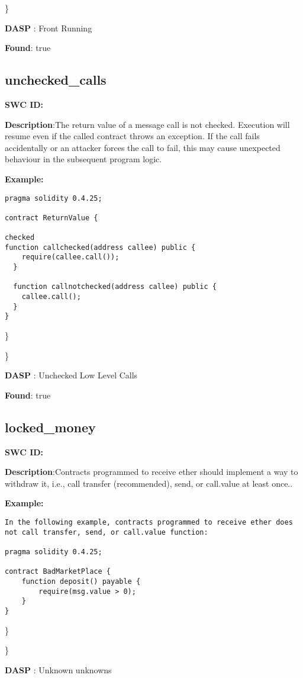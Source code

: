 \documentclass{article}
\begin{document}
\} 

\textbf{DASP} : Front Running

\textbf{Found}: true

\subsection{unchecked\_calls} 
\textbf{SWC \textunderscore ID:} 

\textbf{Description}:The return value of a message call is not checked. Execution will resume even if the called contract throws an exception. If the call fails accidentally or an attacker forces the call to fail, this may cause unexpected behaviour in the subsequent program logic.


\textbf{Example:} 
\begin{verbatim}
pragma solidity 0.4.25;

contract ReturnValue {

checked
function callchecked(address callee) public {
    require(callee.call());
  }

  function callnotchecked(address callee) public {
    callee.call();
  }
}

\end{verbatim}\} 

\} 

\textbf{DASP} : Unchecked Low Level Calls

\textbf{Found}: true

\subsection{locked\_money} 
\textbf{SWC \textunderscore ID:} 

\textbf{Description}:Contracts programmed to receive ether should implement a way to withdraw it, i.e., call transfer (recommended), send, or call.value at least once..


\textbf{Example:} 
\begin{verbatim}
In the following example, contracts programmed to receive ether does not call transfer, send, or call.value function:

pragma solidity 0.4.25;

contract BadMarketPlace {
    function deposit() payable {
        require(msg.value > 0);
    }
}

\end{verbatim}\} 

\} 

\textbf{DASP} : Unknown unknowns
\end{document}
